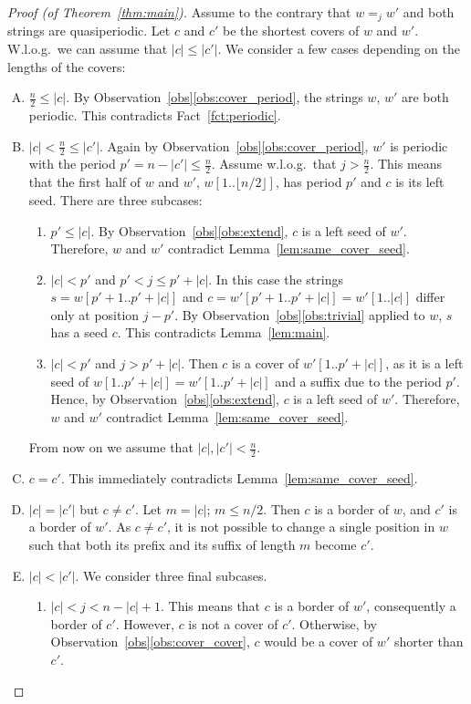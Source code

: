\documentclass{article}
\begin{document}
  \begin{proof}[Proof (of Theorem~\ref{thm:main})]
    Assume to the contrary that $w =_j w'$ and both strings are quasiperiodic.
    Let $c$ and $c'$ be the shortest covers of $w$ and $w'$.
    W.l.o.g.\ we can assume that $|c| \le |c'|$.
    We consider a few cases depending on the lengths of the covers:
    \begin{enumerate}[(A)]
      \item $\frac{n}{2} \le |c|$.
        By Observation~\ref{obs}\ref{obs:cover_period}, the strings $w$, $w'$ are both periodic.
        This contradicts Fact~\ref{fct:periodic}.
      \item $|c| < \frac{n}{2} \le |c'|$.
        Again by Observation~\ref{obs}\ref{obs:cover_period}, $w'$ is periodic with the period $p'=n-|c'| \le \frac{n}{2}$.
        Assume w.l.o.g.\ that $j > \frac{n}{2}$.
        This means that the first half of $w$ and $w'$, $w[1..\lfloor n/2\rfloor]$, has period $p'$ and $c$ is its left seed.
        There are three subcases:
        \begin{enumerate}[(B1)]
          \item $p' \le |c|$.
          By Observation~\ref{obs}\ref{obs:extend}, $c$ is a left seed of $w'$.
          Therefore, $w$ and $w'$ contradict Lemma~\ref{lem:same_cover_seed}.
          \item $|c| < p'$ and $p' < j \le p'+|c|$.
          In this case the strings $s=w[p'+1..p'+|c|]$ and $c=w'[p'+1..p'+|c|]=w'[1..|c|]$ differ only at position $j-p'$.
          By Observation~\ref{obs}\ref{obs:trivial} applied to $w$, $s$ has a seed $c$.
          This contradicts Lemma~\ref{lem:main}.
          \item $|c| < p'$ and $j > p'+|c|$.
          Then $c$ is a cover of $w'[1..p'+|c|]$, as it is a left seed of
          $w[1..p'+|c|]=w'[1..p'+|c|]$ and a suffix due to the period $p'$.
          Hence, by Observation~\ref{obs}\ref{obs:extend}, $c$ is a left seed of $w'$.
          Therefore, $w$ and $w'$ contradict Lemma~\ref{lem:same_cover_seed}.
        \end{enumerate}
        From now on we assume that $|c|,|c'| < \frac{n}{2}$.
      \item $c=c'$.
        This immediately contradicts Lemma~\ref{lem:same_cover_seed}.
      \item $|c|=|c'|$ but $c \ne c'$.
        Let $m=|c|$; $m \le n/2$.
        Then $c$ is a border of $w$, and $c'$ is a border of $w'$.
        As $c \ne c'$, it is not possible to change a single position in $w$ such that
        both its prefix and its suffix of length $m$ become $c'$.
      \item $|c|<|c'|$.
        We consider three final subcases.
        \begin{enumerate}[(E1)]
          \item $|c| < j < n-|c|+1$.
            This means that $c$ is a border of $w'$, consequently a border of $c'$.
            However, $c$ is not a cover of $c'$.
            Otherwise, by Observation~\ref{obs}\ref{obs:cover_cover}, $c$ would be a cover of $w'$ shorter than $c'$.


\end{enumerate}
\end{enumerate}
\end{proof}
\end{document}
